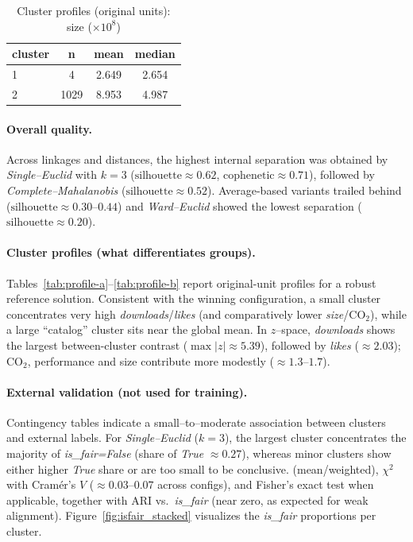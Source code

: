 \documentclass[journal]{IEEEtran}
\begin{document}
\begin{table}[H]
	\centering
	\small
	\caption{Cluster profiles (original units): size ($\times 10^{8}$)}
	\label{tab:profile-c}
	\renewcommand{\arraystretch}{1.1}
	\begin{tabular}{l S[table-format=4.0] S[table-format=1.3] S[table-format=1.3]}
		\toprule
		\textbf{cluster} & \textbf{n} & \textbf{mean} & \textbf{median} \\
		 & 4    & 2.649 & 2.654 \\
		2 & 1029 & 8.953 & 4.987 \\
		\bottomrule
	\end{tabular}
\end{table}

\paragraph{Overall quality.}
Across linkages and distances, the highest internal separation was obtained by \emph{Single–Euclid} with $k=3$
($\text{silhouette}\approx 0.62$, $\text{cophenetic}\approx 0.71$), followed by \emph{Complete–Mahalanobis}
($\text{silhouette}\approx 0.52$). Average-based variants trailed behind
($\text{silhouette}\approx 0.30$–$0.44$) and \emph{Ward–Euclid} showed the lowest separation
($\text{silhouette}\approx 0.20$).

\paragraph{Cluster profiles (what differentiates groups).}
Tables~\ref{tab:profile-a}–\ref{tab:profile-b} report original-unit profiles for a robust
reference solution. Consistent with the winning configuration, a small cluster concentrates very high
\emph{downloads}/\emph{likes} (and comparatively lower \emph{size}/CO$_2$), while a large “catalog” cluster
sits near the global mean. In $z$–space, \emph{downloads} shows the largest between-cluster contrast
($\max|z|\approx 5.39$), followed by \emph{likes} ($\approx 2.03$); CO$_2$, performance and size contribute
more modestly ($\approx 1.3$–$1.7$).

\paragraph{External validation (not used for training).}
Contingency tables indicate a small–to–moderate association between clusters and external labels.
For \emph{Single–Euclid} ($k=3$), the largest cluster concentrates the majority of \emph{is\_fair=False}
(share of \emph{True} $\approx 0.27$), whereas minor clusters show either higher \emph{True} share or are too small
to be conclusive.  (mean/weighted),
$\chi^{2}$ with Cramér’s $V$ ($\approx 0.03$–$0.07$ across configs), and Fisher’s exact test when applicable,
together with ARI vs.~\emph{is\_fair} (near zero, as expected for weak alignment).
Figure~\ref{fig:isfair_stacked} visualizes the \emph{is\_fair} proportions per cluster.
\end{document}
